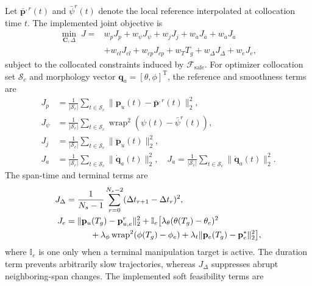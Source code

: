 \documentclass[journal,twoside]{IEEEtran}
\newcommand{\wrap}{\operatorname{wrap}}
\begin{document}
Let $\bar{\mathbf p}^{,r}(t)$ and $\bar\psi^r(t)$ denote the local reference interpolated at collocation time $t$. The implemented joint objective is
\begin{equation}
\begin{aligned}
\min_{\mathbf C,\Delta}\;J={}&w_pJ_p+w_\psi J_\psi+w_jJ_j
+w_{\dot a}J_{\dot a}+w_{\ddot a}J_{\ddot a}\\
&+w_{cl}J_{cl}+w_{cp}J_{cp}+w_TT_g
+w_\Delta J_\Delta+w_eJ_e,
\end{aligned}
\label{eq:joint_objective}
\end{equation}
subject to the collocated constraints induced by $\mathcal F_{\mathrm{safe}}$. For optimizer collocation set $\mathcal S_c$ and morphology vector $\mathbf q_a=[\theta,\phi]^{\mathrm T}$, the reference and smoothness terms are
\begin{equation}
\begin{aligned}
J_p&=\frac{1}{|\mathcal S_c|}\sum_{t\in\mathcal S_c}
\|\mathbf p_u(t)-\bar{\mathbf p}^{,r}(t)\|_2^2,\\
J_\psi&=\frac{1}{|\mathcal S_c|}\sum_{t\in\mathcal S_c}
\wrap^2(\psi(t)-\bar\psi^r(t)),\\
J_j&=\frac{1}{|\mathcal S_c|}\sum_{t\in\mathcal S_c}
\|\dddot{\mathbf p}_u(t)\|_2^2,\\
J_{\dot a}&=\frac{1}{|\mathcal S_c|}\sum_{t\in\mathcal S_c}
\|\dot{\mathbf q}_a(t)\|_2^2,\quad
J_{\ddot a}=\frac{1}{|\mathcal S_c|}\sum_{t\in\mathcal S_c}
\|\ddot{\mathbf q}_a(t)\|_2^2.
\end{aligned}
\label{eq:tracking_smoothness_terms}
\end{equation}
The span-time and terminal terms are
\begin{equation}
\begin{aligned}
J_\Delta&=\frac{1}{N_s-1}\sum_{r=0}^{N_s-2}
(\Delta t_{r+1}-\Delta t_r)^2,\\
J_e&=\|\mathbf p_u(T_g)-\mathbf p^r_{u,e}\|_2^2
+\mathbb I_e\big[\lambda_\theta(\theta(T_g)-\theta_e)^2\\
&\hspace{10mm}+\lambda_\phi\wrap^2(\phi(T_g)-\phi_e)
+\lambda_t\|\mathbf p_e(T_g)-\mathbf p_e^*\|_2^2\big],
\end{aligned}
\label{eq:time_terminal_terms}
\end{equation}
where $\mathbb I_e$ is one only when a terminal manipulation target is active. The duration term prevents arbitrarily slow trajectories, whereas $J_\Delta$ suppresses abrupt neighboring-span changes. The implemented soft feasibility terms are
\end{document}
